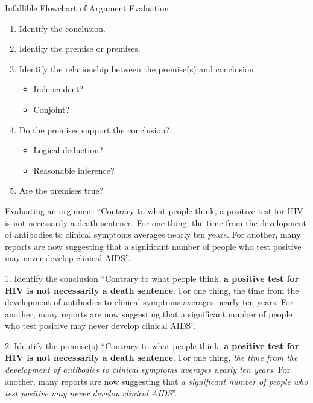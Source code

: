 \documentclass{beamer}
\begin{document}
\begin{frame}{Infallible Flowchart of Argument Evaluation}
\begin{enumerate}
\item Identify the conclusion.
\item Identify the premise or premises.
\item Identify the relationship between the premise(s) and conclusion.
\begin{itemize}
\item Independent?
\item Conjoint?
\end{itemize}
\item Do the premises support the conclusion?
\begin{itemize}
\item Logical deduction?
\item Reasonable inference?
\end{itemize}
\item Are the premises true?
\end{enumerate}
\end{frame}

\begin{frame}{Evaluating an argument}
``Contrary to what people think, a positive test for HIV is not necessarily a death sentence. For one thing, the time from the development of antibodies to clinical symptoms averages nearly ten years. For another, many reports are now suggesting that a significant number of people who test positive may never develop clinical AIDS''.
\end{frame}


\begin{frame}{1. Identify the conclusion}
``Contrary to what people think, \textbf{a positive test for HIV is not necessarily a death sentence}. For one thing, the time from the development of antibodies to clinical symptoms averages nearly ten years. For another, many reports are now suggesting that a significant number of people who test positive may never develop clinical AIDS''.
\end{frame}


\begin{frame}{2. Identify the premise(s)}
``Contrary to what people think, \textbf{a positive test for HIV is not necessarily a death sentence}. For one thing, \emph{the time from the development of antibodies to clinical symptoms averages nearly ten years}. For another, many reports are now suggesting that \emph{a significant number of people who test positive may never develop clinical AIDS}''.
\end{frame}
\end{document}
